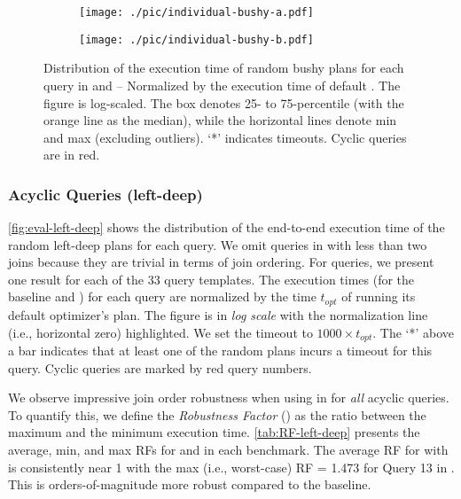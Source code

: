 \begin{figure*}[t!]
    \centering
    \begin{subfigure}{0.34\linewidth}
        \texttt{[image: ./pic/individual-bushy-a.pdf]}
        \caption{\tpch}
        \label{fig:eval-bushy-tpch}
    \end{subfigure}
    \begin{subfigure}{0.64\linewidth}
        \texttt{[image: ./pic/individual-bushy-b.pdf]}
        \caption{\job}
        \label{fig:eval-bushy-job}
    \end{subfigure}
    \caption{Distribution of the execution time of random bushy plans for each query in \tpch and \job \textnormal{-- Normalized by the execution time of default \duckdb. The figure is log-scaled. The box denotes 25- to 75-percentile (with the orange line as the median), while the horizontal lines denote min and max (excluding outliers). `*' indicates timeouts. Cyclic queries are in red.}}
    \label{fig:eval-bushy}
\end{figure*}


\subsubsection{Acyclic Queries (left-deep)}
\cref{fig:eval-left-deep} shows the distribution of the end-to-end execution time of the random left-deep plans for each query. We omit queries in \tpch with less than two joins because they are trivial in terms of join ordering. For \job queries, we present one result for each of the 33 query templates. The execution times (for the baseline and \rpt) for each query are normalized by the time $t_{opt}$ of \duckdb running its default optimizer's plan. The figure is in \emph{log scale} with the normalization line (i.e., horizontal zero) highlighted. We set the timeout to $1000 \times t_{opt}$. The `*' above a bar indicates that at least one of the random plans incurs a timeout for this query. Cyclic queries are marked by red query numbers.

We observe impressive join order robustness when using \rpt in \duckdb for \emph{all} acyclic queries. To quantify this, we define the \emph{Robustness Factor} (\robustmetric) as the ratio between the maximum and the minimum execution time. \cref{tab:RF-left-deep} presents the average, min, and max RFs for \duckdb and \rpt in each benchmark. The average RF for \duckdb with \rpt is consistently near 1 with the max (i.e., worst-case) RF = 1.473 for Query 13 in \tpcds. This is orders-of-magnitude more robust compared to the baseline. 

